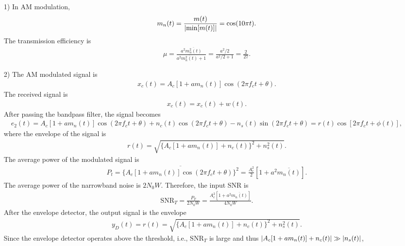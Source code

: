 \documentclass{assignment}
\begin{document}
\begin{sol}
    \begin{itemize}
        \item[1)] In AM modulation,
        \begin{align}
            m_n(t)=\frac{m(t)}{\left\lvert\min[m(t)]\right\rvert}=\cos(10\pi t).
        \end{align}
        The transmission efficiency is
        \begin{align}
            \mu=\frac{a^2\overline{m_n^2(t)}}{a^2\overline{m_n^2(t)}+1}=\frac{a^2/2}{a^2/2+1}=\frac{2}{27}.
        \end{align}
        \item[2)] The AM modulated signal is
        \begin{align}
            x_c(t)=A_c[1+am_n(t)]\cos(2\pi f_ct+\theta).
        \end{align}
        The received signal is
        \begin{align}
            x_c(t)=x_c(t)+w(t).
        \end{align}
        After passing the bandpass filter, the signal becomes
        \begin{align}
            e_2(t)=A_c[1+am_n(t)]\cos(2\pi f_ct+\theta)+n_c(t)\cos(2\pi f_ct+\theta)-n_s(t)\sin(2\pi f_ct+\theta)=r(t)\cos[2\pi f_ct+\phi(t)],
        \end{align}
        where the envelope of the signal is
        \begin{align}
            r(t)=\sqrt{\{A_c[1+am_n(t)]+n_c(t)\}^2+n_s^2(t)}.
        \end{align}
        The average power of the modulated signal is
        \begin{align}
            P_t=\overline{\{A_c[1+am_n(t)]\cos(2\pi f_ct+\theta)\}^2}=\frac{A_c^2}{2}\left[1+a^2\overline{m_n(t)}\right].
        \end{align}
        The average power of the narrowband noise is $2N_0W$. Therefore, the input SNR is
        \begin{align}
            \text{SNR}_T=\frac{P_T}{2N_0W}=\frac{A_c^2\left[1+a^2\overline{m_n(t)}\right]}{4N_0W}.
        \end{align}
        After the envelope detector, the output signal is the envelope
        \begin{align}
            y_D(t)=r(t)=\sqrt{\{A_c[1+am_n(t)]+n_c(t)\}^2+n_s^2(t)}.
        \end{align}
        Since the envelope detector operates above the threshold, i.e., $\text{SNR}_T$ is large and thus $\left\lvert A_c[1+am_n(t)]+n_c(t)\right\rvert\gg\left\lvert n_s(t)\right\rvert$,

\end{itemize}
\end{sol}
\end{document}
